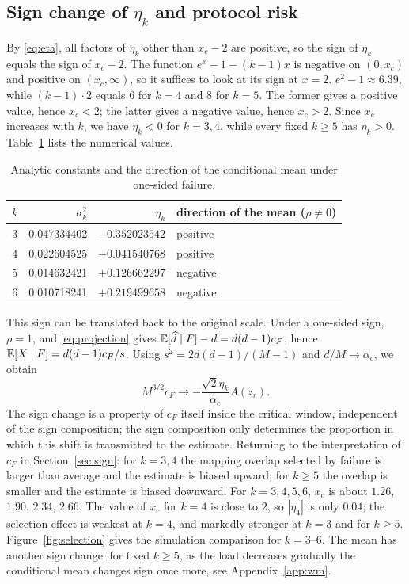 
\subsection{Sign change of $\eta_k$ and protocol risk}\label{sec:flip}
By \eqref{eq:eta}, all factors of $\eta_k$ other than $x_c-2$ are positive, so the sign of $\eta_k$
equals the sign of $x_c-2$. The function $e^x-1-(k-1)x$ is negative on $(0,x_c)$ and positive on
$(x_c,\infty)$, so it suffices to look at its sign at $x=2$. $e^2-1\approx6.39$, while $(k-1)\cdot2$
equals $6$ for $k=4$ and $8$ for $k=5$. The former gives a positive value, hence $x_c<2$; the latter
gives a negative value, hence $x_c>2$. Since $x_c$ increases with $k$, we have $\eta_k<0$ for
$k=3,4$, while every fixed $k\ge5$ has $\eta_k>0$.
Table~\ref{tab:constants} lists the numerical values.

\begin{table}[!htbp]
\centering
\caption{Analytic constants and the direction of the conditional mean under one-sided failure.}
\begin{tabular}{rrrl}
\toprule
$k$ & $\sigma_k^2$ & $\eta_k$ & direction of the mean ($\rho\ne0$)\\
\midrule
3 & 0.047334402 & $-0.352023542$ & positive\\
4 & 0.022604525 & $-0.041540768$ & positive\\
5 & 0.014632421 & $+0.126662297$ & negative\\
6 & 0.010718241 & $+0.219499658$ & negative\\
\bottomrule
\end{tabular}
\label{tab:constants}
\end{table}

This sign can be translated back to the original scale. Under a one-sided sign, $\rho=1$, and
\eqref{eq:projection} gives $\mathbb E[\widehat d\mid F]-d=d(d-1)c_F$, hence $\mathbb E[X\mid F]=d(d-1)c_F/s$.
Using $s^2=2d(d-1)/(M-1)$ and $d/M\to\alpha_c$, we obtain
\begin{equation*}
M^{3/2}c_F\longrightarrow
-\frac{\sqrt2\eta_k}{\alpha_c}A(z_r).
\end{equation*}
The sign change is a property of $c_F$ itself inside the critical window, independent of the sign
composition; the sign composition only determines the proportion in which this shift is transmitted
to the estimate. Returning to the interpretation of $c_F$ in Section~\ref{sec:sign}: for $k=3,4$ the
mapping overlap selected by failure is larger than average and the estimate is biased upward; for
$k\ge5$ the overlap is smaller and the estimate is biased downward. For $k=3,4,5,6$, $x_c$ is about
$1.26$, $1.90$, $2.34$, $2.66$. The value of $x_c$ for $k=4$ is close to $2$, so $|\eta_4|$ is only
$0.04$; the selection effect is weakest at $k=4$, and markedly stronger at $k=3$ and for $k\ge5$.
Figure~\ref{fig:selection} gives the simulation comparison for $k=3$--$6$. The mean has another sign
change: for fixed $k\ge5$, as the load decreases gradually the conditional mean changes sign once
more, see Appendix~\ref{app:wm}.

